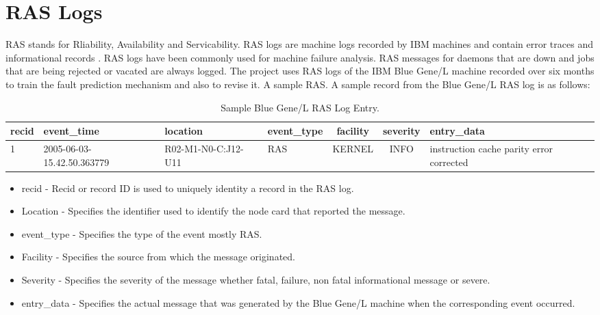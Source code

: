 \section{RAS Logs}
RAS stands for Rliability, Availability and Servicability. RAS logs are machine logs recorded by IBM machines and contain error traces and informational records . RAS logs have been commonly used for machine failure analysis. RAS messages for daemons that are down and jobs that are being rejected or vacated are always logged. The project uses RAS logs of the IBM Blue Gene/L machine recorded over six months to train the fault prediction mechanism and also to revise it. A sample RAS. A sample record from the Blue Gene/L RAS log is as follows:
\begin{table}[h]
\begin{center}
\small
\begin{tabular}{| p{1cm} | p{2.5cm} | p{1.5cm} | p{2cm} | c | c | p{3cm} |}
\hline	
	\bf{recid} & \bf{event\_time} & \bf{location} & \bf{event\_type} & \bf{facility} & \bf{severity} & \bf{entry\_data} \\ \hline
	1 & 2005-06-03-15.42.50.363779 & R02-M1-N0-C:J12-U11 & RAS & KERNEL & INFO & instruction cache parity error corrected \\ \hline
\end{tabular}
\label{table2}
\end{center}
	\caption{Sample Blue Gene/L RAS Log Entry.}
\end{table}
\begin{itemize}
	\item recid - Recid or record ID is used to uniquely identity a record in the RAS log.
	\item Location - Specifies the identifier used to identify the node card that reported the message.
	\item event\_type - Specifies the type of the event mostly RAS.
	\item Facility - Specifies the source from which the message originated.
	\item Severity - Specifies the severity of the message whether fatal, failure, non fatal informational message or severe.
	\item entry\_data - Specifies the actual message that was generated by the Blue Gene/L machine when the corresponding event occurred.
\end{itemize}
